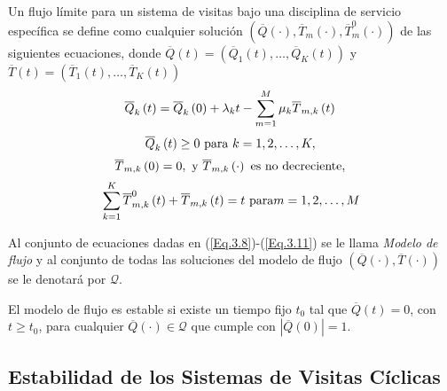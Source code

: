 \begin{Def}
Un flujo l\'imite para un sistema de visitas bajo una disciplina de
servicio espec\'ifica se define como cualquier soluci\'on
 $\left(\overline{Q}\left(\cdot\right),\overline{T}_{m}\left(\cdot\right),\overline{T}_{m}^{0}\left(\cdot\right)\right)$
 de las siguientes ecuaciones, donde
$\overline{Q}\left(t\right)=\left(\overline{Q}_{1}\left(t\right),\ldots,\overline{Q}_{K}\left(t\right)\right)$
y
$\overline{T}\left(t\right)=\left(\overline{T}_{1}\left(t\right),\ldots,\overline{T}_{K}\left(t\right)\right)$
\begin{equation}\label{Eq.3.8}
\overline{Q}_{k}\left(t\right)=\overline{Q}_{k}\left(0\right)+\lambda_{k}t-\sum_{m=1}^{M}\mu_{k}\overline{T}_{m,k}\left(t\right)\\
\end{equation}
\begin{equation}\label{Eq.3.9}
\overline{Q}_{k}\left(t\right)\geq0\textrm{ para }k=1,2,\ldots,K,\\
\end{equation}
\begin{equation}\label{Eq.3.10}
\overline{T}_{m,k}\left(0\right)=0,\textrm{ y }\overline{T}_{m,k}\left(\cdot\right)\textrm{ es no decreciente},\\
\end{equation}
\begin{equation}\label{Eq.3.11}
\sum_{k=1}^{K}\overline{T}_{m,k}^{0}\left(t\right)+\overline{T}_{m,k}\left(t\right)=t\textrm{ para}m=1,2,\ldots,M\\
\end{equation}
\end{Def}

Al conjunto de ecuaciones dadas en (\ref{Eq.3.8})-(\ref{Eq.3.11}) se
le llama {\em Modelo de flujo} y al conjunto de todas las
soluciones del modelo de flujo
$\left(\overline{Q}\left(\cdot\right),\overline{T}
\left(\cdot\right)\right)$ se le denotar\'a por $\mathcal{Q}$.


\begin{Def}
El modelo de flujo es estable si existe un tiempo fijo $t_{0}$ tal
que $\overline{Q}\left(t\right)=0$, con $t\geq t_{0}$, para
cualquier $\overline{Q}\left(\cdot\right)\in\mathcal{Q}$ que
cumple con $|\overline{Q}\left(0\right)|=1$.
\end{Def}


%
\subsection{Estabilidad de los Sistemas de Visitas C\'iclicas}

